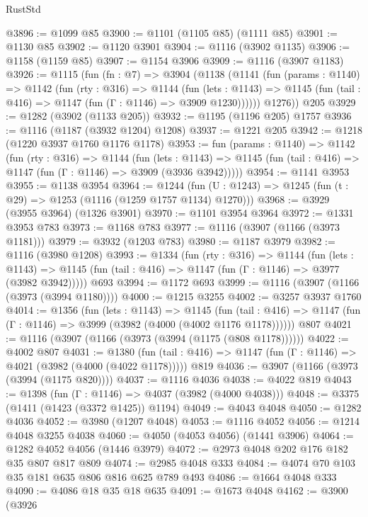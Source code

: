 \begin{lexlean}{RustStd}
\begin{coremodule}
{\begin{coremodule}
{{{{{{{{{{{@3896 := @1099 @85
@3900 := @1101 (@1105 @85) (@1111 @85)
@3901 := @1130 @85
@3902 := @1120 @3901
@3904 := @1116 (@3902 @1135)
@3906 := @1158 (@1159 @85)
@3907 := @1154 @3906
@3909 := @1116 (@3907 @1183)
@3926 := @1115
    (fun (fn : @7) =>
    @3904
      (@1138
        (@1141
          (fun (params : @1140) =>
          @1142
            (fun (rty : @316) =>
            @1144
              (fun (lets : @1143) =>
              @1145 (fun (tail : @416) => @1147 (fun (Γ : @1146) => @3909 @1230))))))
        @1276))
    @205
@3929 := @1282 (@3902 (@1133 @205))
@3932 := @1195 (@1196 @205) @1757
@3936 := @1116 (@1187 (@3932 @1204) @1208)
@3937 := @1221 @205
@3942 := @1218 (@1220 @3937 @1760 @1176 @1178)
@3953 := fun (params : @1140) =>
  @1142
    (fun (rty : @316) =>
    @1144
      (fun (lets : @1143) =>
      @1145 (fun (tail : @416) => @1147 (fun (Γ : @1146) => @3909 (@3936 @3942)))))
@3954 := @1141 @3953
@3955 := @1138 @3954
@3964 := @1244 (fun (U : @1243) => @1245 (fun (t : @29) => @1253 (@1116 (@1259 @1757 @1134) @1270)))
@3968 := @3929 (@3955 @3964) (@1326 @3901)
@3970 := @1101 @3954 @3964
@3972 := @1331 @3953 @783
@3973 := @1168 @783
@3977 := @1116 (@3907 (@1166 (@3973 @1181)))
@3979 := @3932 (@1203 @783)
@3980 := @1187 @3979
@3982 := @1116 (@3980 @1208)
@3993 := @1334
    (fun (rty : @316) =>
    @1144
      (fun (lets : @1143) =>
      @1145 (fun (tail : @416) => @1147 (fun (Γ : @1146) => @3977 (@3982 @3942)))))
    @693
@3994 := @1172 @693
@3999 := @1116 (@3907 (@1166 (@3973 (@3994 @1180))))
@4000 := @1215 @3255
@4002 := @3257 @3937 @1760
@4014 := @1356
    (fun (lets : @1143) =>
    @1145
      (fun (tail : @416) => @1147 (fun (Γ : @1146) => @3999 (@3982 (@4000 (@4002 @1176 @1178))))))
    @807
@4021 := @1116 (@3907 (@1166 (@3973 (@3994 (@1175 (@808 @1178))))))
@4022 := @4002 @807
@4031 := @1380
    (fun (tail : @416) => @1147 (fun (Γ : @1146) => @4021 (@3982 (@4000 (@4022 @1178)))))
    @819
@4036 := @3907 (@1166 (@3973 (@3994 (@1175 @820))))
@4037 := @1116 @4036
@4038 := @4022 @819
@4043 := @1398 (fun (Γ : @1146) => @4037 (@3982 (@4000 @4038)))
@4048 := @3375 (@1411 (@1423 (@3372 @1425)) @1194)
@4049 := @4043 @4048
@4050 := @1282 @4036
@4052 := @3980 (@1207 @4048)
@4053 := @1116 @4052
@4056 := @1214 @4048 @3255 @4038
@4060 := @4050 (@4053 @4056) (@1441 @3906)
@4064 := @1282 @4052 @4056 (@1446 @3979)
@4072 := @2973 @4048 @202 @176 @182 @35 @807 @817 @809
@4074 := @2985 @4048 @333
@4084 := @4074 @70 @103 @35 @181 @635 @806 @816 @625 @789 @493
@4086 := @1664 @4048 @333
@4090 := @4086 @18 @35 @18 @635
@4091 := @1673 @4048
@4162 := @3900
    (@3926
}}}}}}}}}}}
\end{coremodule}}
\end{coremodule}
\end{lexlean}
